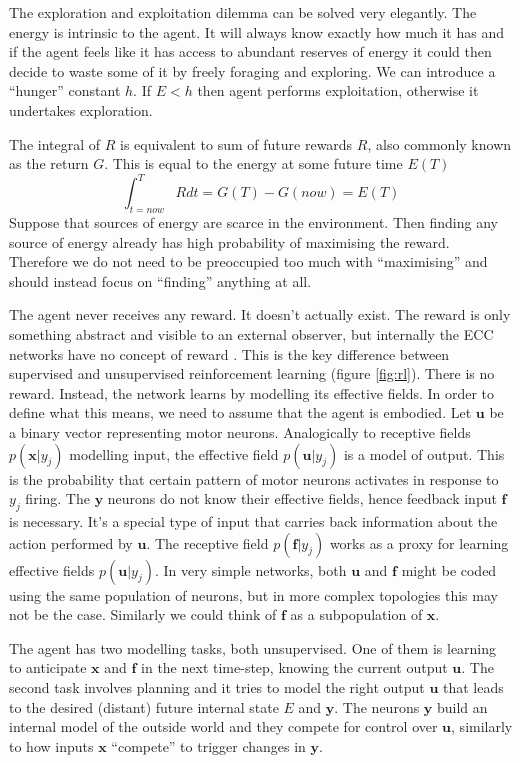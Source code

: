\documentclass[12pt]{article}
\begin{document}
The exploration and exploitation dilemma can be solved very elegantly. The energy is intrinsic to the agent. It will always know exactly how much it has and if the agent feels like it has access to abundant reserves of energy it could then decide to waste some of it by freely foraging and exploring. We can introduce a ``hunger'' constant  $h$. If $E<h$ then agent performs exploitation, otherwise it undertakes exploration.

The integral of $R$ is equivalent to sum of future rewards $R$, also commonly known as the return $G$. This is equal to the energy at some future time $E(T)$
\[
\int_{t=now}^{T} R dt = G(T) - G(now) = E(T)
\]
Suppose that sources of energy are scarce in the environment. Then finding any source of energy already has high probability of maximising the reward. Therefore we do not need to be preoccupied too much with ``maximising'' and should instead focus on ``finding'' anything at all. 

The agent never receives any reward. It doesn't actually exist. The reward is only something abstract and visible to an external observer, but internally the ECC networks have no concept of reward . This is the key difference between supervised and unsupervised reinforcement learning (figure \ref{fig:rl}). There is no reward. Instead, the network learns by modelling its effective fields. In order to define what this means, we need to assume that the agent is embodied. Let $\boldsymbol{u}$ be a binary vector representing motor neurons.
Analogically to receptive fields $p(\boldsymbol{x}|y_j)$ modelling input, the effective field
$p(\boldsymbol{u}|y_j)$ is a model of output. This is the probability that certain pattern of motor neurons activates in response to $y_j$ firing. The $\boldsymbol{y}$ neurons do not know their effective fields, hence feedback input $\boldsymbol{f}$ is necessary. It's a special type of input that carries back information about the action performed by $\boldsymbol{u}$. The receptive field $p(\boldsymbol{f}|y_j)$ works as a proxy for learning effective fields $p(\boldsymbol{u}|y_j)$. In very simple networks, both $\boldsymbol{u}$ and $\boldsymbol{f}$ might be coded using the same population of neurons, but in more complex topologies this may not be the case. Similarly we could think of $\boldsymbol{f}$ as a subpopulation of $\boldsymbol{x}$. 

The agent has two modelling tasks, both unsupervised. One of them is learning to anticipate $\boldsymbol{x}$ and $\boldsymbol{f}$ in the next time-step, knowing the current output $\boldsymbol{u}$. The second task involves planning and it tries to model the right output $\boldsymbol{u}$ that leads to the desired (distant) future internal state $E$ and $\boldsymbol{y}$. The neurons $\boldsymbol{y}$ build an internal model of the outside world and they compete for control over $\boldsymbol{u}$, similarly to how inputs $\boldsymbol{x}$ ``compete'' to trigger changes in $\boldsymbol{y}$.
\end{document}
